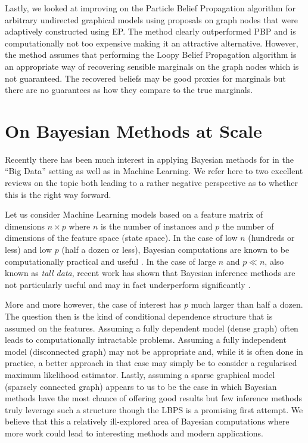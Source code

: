 Lastly, we looked at improving on the Particle Belief Propagation algorithm for arbitrary undirected graphical models using proposals on graph nodes that were adaptively constructed using EP. The method clearly outperformed PBP and is computationally not too expensive making it an attractive alternative. However, the method assumes that performing the Loopy Belief Propagation algorithm is an appropriate way of recovering sensible marginals on the graph nodes which is not guaranteed. The recovered beliefs may be good proxies for marginals but there are no guarantees as how they compare to the true marginals.

\section{On Bayesian Methods at Scale}

Recently there has been much interest in applying Bayesian methods for in the ``Big Data'' setting as well as in Machine Learning. We refer here to two excellent reviews on the topic \citet{green15, bardenet17} both leading to a rather negative perspective as to whether this is the right way forward. 

Let us consider Machine Learning models based on a feature matrix of dimensions $n \times p$ where $n$ is the number of instances and $p$ the number of dimensions of the feature space (state space). In the case of low $n$ (hundreds or less) and low $p$ (half a dozen or less), Bayesian computations are known to be computationally practical and useful \citep{gelman13}. In the case of large $n$ and $p\ll n$, also known as \emph{tall data}, recent work has shown that Bayesian inference methods are not particularly useful and may in fact underperform significantly \citep{bardenet17, nagapetyan17}.

More and more however, the case of interest has $p$ much larger than half a dozen. The question then is the kind of conditional dependence structure that is assumed on the features. Assuming a fully dependent model (dense graph) often leads to computationally intractable problems. Assuming a fully independent model (disconnected graph) may not be appropriate and, while it is often done in practice, a better approach in that case may simply be to consider a regularised maximum likelihood estimator. Lastly, assuming a sparse graphical model (sparsely connected graph) appears to us to be the case in which Bayesian methods have the most chance of offering good results but few inference methods truly leverage such a structure though the LBPS is a promising first attempt. We believe that this a relatively ill-explored area of Bayesian computations where more work could lead to interesting methods and modern applications.
